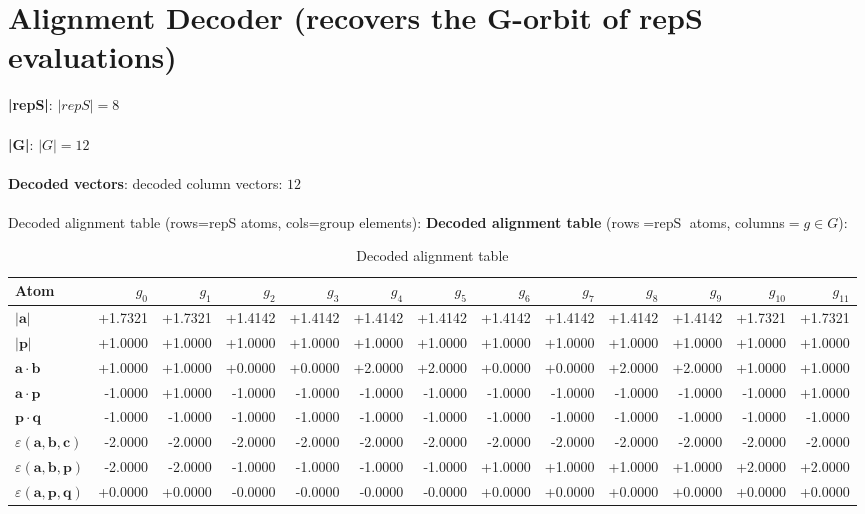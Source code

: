 \documentclass[a4paper,11pt]{article}
\newcommand{\vc}[1]{\ensuremath{\mathbf{#1}}}
\newcommand{\dnfagmiihhiejm}[1]{|\vc{#1}|}
\newcommand{\pdcegfomjfhook}[2]{\mathbf{#1} \cdot \mathbf{#2}}
\newcommand{\kblbmcpggoncpf}[3]{\varepsilon(\mathbf{#1},\mathbf{#2},\mathbf{#3})}
\begin{document}
\section{Alignment Decoder  (recovers the G-orbit of repS evaluations)}
\textbf{  |repS|}: $|repS| = 8$\\\\
\textbf{  |G|}: $|G| = 12$\\\\
\textbf{  Decoded vectors}: decoded column vectors: $12$\\\\

  Decoded alignment table  (rows=repS atoms, cols=group elements):
\textbf{Decoded alignment table} (rows$=\text{repS}$ atoms, columns$=g\in G$):\\
\begin{table}[h]\centering
\caption{Decoded alignment table}
\begin{tabular}{lrrrrrrrrrrrr}
\toprule
Atom & $g_{0}$ & $g_{1}$ & $g_{2}$ & $g_{3}$ & $g_{4}$ & $g_{5}$ & $g_{6}$ & $g_{7}$ & $g_{8}$ & $g_{9}$ & $g_{10}$ & $g_{11}$ \\
\midrule
$\dnfagmiihhiejm{a}$ & +1.7321 & +1.7321 & +1.4142 & +1.4142 & +1.4142 & +1.4142 & +1.4142 & +1.4142 & +1.4142 & +1.4142 & +1.7321 & +1.7321 \\
$\dnfagmiihhiejm{p}$ & +1.0000 & +1.0000 & +1.0000 & +1.0000 & +1.0000 & +1.0000 & +1.0000 & +1.0000 & +1.0000 & +1.0000 & +1.0000 & +1.0000 \\
$\pdcegfomjfhook{a}{b}$ & +1.0000 & +1.0000 & +0.0000 & +0.0000 & +2.0000 & +2.0000 & +0.0000 & +0.0000 & +2.0000 & +2.0000 & +1.0000 & +1.0000 \\
$\pdcegfomjfhook{a}{p}$ & -1.0000 & +1.0000 & -1.0000 & -1.0000 & -1.0000 & -1.0000 & -1.0000 & -1.0000 & -1.0000 & -1.0000 & -1.0000 & +1.0000 \\
$\pdcegfomjfhook{p}{q}$ & -1.0000 & -1.0000 & -1.0000 & -1.0000 & -1.0000 & -1.0000 & -1.0000 & -1.0000 & -1.0000 & -1.0000 & -1.0000 & -1.0000 \\
$\kblbmcpggoncpf{a}{b}{c}$ & -2.0000 & -2.0000 & -2.0000 & -2.0000 & -2.0000 & -2.0000 & -2.0000 & -2.0000 & -2.0000 & -2.0000 & -2.0000 & -2.0000 \\
$\kblbmcpggoncpf{a}{b}{p}$ & -2.0000 & -2.0000 & -1.0000 & -1.0000 & -1.0000 & -1.0000 & +1.0000 & +1.0000 & +1.0000 & +1.0000 & +2.0000 & +2.0000 \\
$\kblbmcpggoncpf{a}{p}{q}$ & +0.0000 & +0.0000 & -0.0000 & -0.0000 & -0.0000 & -0.0000 & +0.0000 & +0.0000 & +0.0000 & +0.0000 & +0.0000 & +0.0000 \\
\bottomrule\end{tabular}\end{table}
\end{document}
